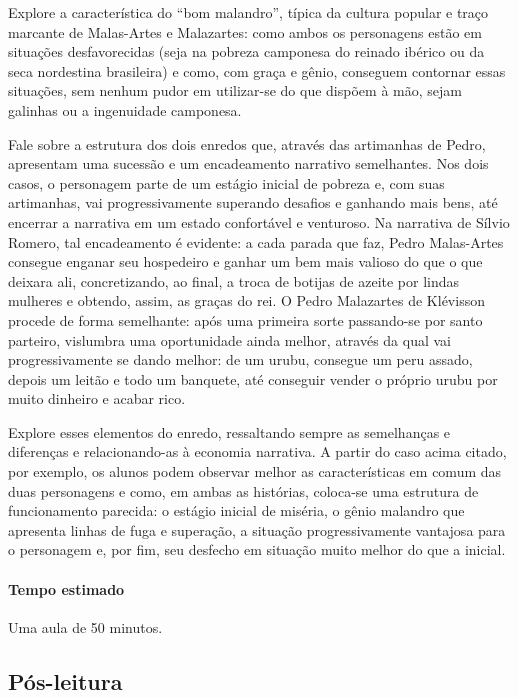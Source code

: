 \documentclass[11pt]{extarticle}
\begin{document}
Explore a característica do ``bom malandro'', típica da cultura popular e traço marcante de Malas-Artes e Malazartes: como ambos os personagens estão em situações desfavorecidas (seja na pobreza camponesa do reinado ibérico ou da seca nordestina brasileira) e como, com graça e gênio, conseguem contornar essas situações, sem nenhum pudor em utilizar-se do que dispõem à mão, sejam galinhas ou a ingenuidade camponesa.

Fale sobre a estrutura dos dois enredos que, através das artimanhas de Pedro, apresentam uma sucessão e um encadeamento narrativo semelhantes. Nos dois casos, o personagem parte de um estágio inicial de pobreza e, com suas artimanhas, vai progressivamente superando desafios e ganhando mais bens, até encerrar a narrativa em um estado confortável e venturoso. Na narrativa de Sílvio Romero, tal encadeamento é evidente: a cada parada que faz, Pedro Malas-Artes consegue enganar seu hospedeiro e ganhar um bem mais valioso do que o que deixara ali, concretizando, ao final, a troca de botijas de azeite por lindas mulheres e obtendo, assim, as graças do rei. O Pedro Malazartes de Klévisson procede de forma semelhante: após uma primeira sorte passando-se por santo parteiro, vislumbra uma oportunidade ainda melhor, através da qual vai progressivamente se dando melhor: de um urubu, consegue um peru assado, depois um leitão e todo um banquete, até conseguir vender o próprio urubu por muito dinheiro e acabar rico.

Explore esses elementos do enredo, ressaltando sempre as semelhanças e diferenças e relacionando-as à economia narrativa. A partir do caso acima citado, por exemplo, os alunos podem observar melhor as características em comum das duas personagens e como, em ambas as histórias, coloca-se uma estrutura de funcionamento parecida: o estágio inicial de miséria, o gênio malandro que apresenta linhas de fuga e superação, a situação progressivamente vantajosa para o personagem e, por fim, seu desfecho em situação muito melhor do que a inicial.

\paragraph{Tempo estimado} Uma aula de 50 minutos.

\subsection{Pós-leitura}
\end{document}
